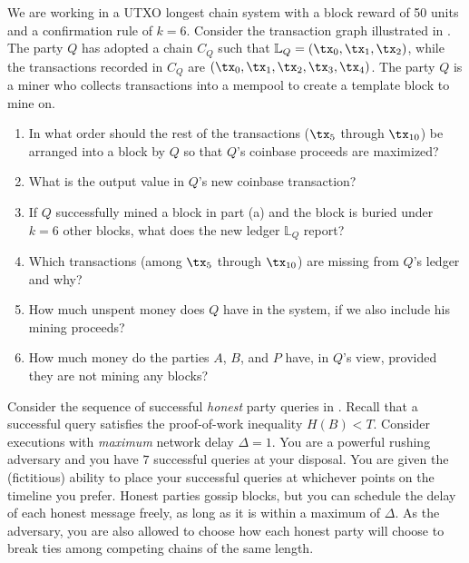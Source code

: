 \begin{problems}
  \item We are working in a UTXO longest chain system with a block reward of 50 units and a confirmation rule of $k = 6$.
        Consider the transaction graph illustrated in .
        The party $Q$ has adopted a chain $C_Q$ such that $\mathbb{L}_Q = (\tx_0, \tx_1, \tx_2)$,
        while the transactions recorded in $C_Q$ are $(\tx_0, \tx_1, \tx_2, \tx_3, \tx_4)$. 
        The party $Q$ is a miner who collects transactions into a mempool to create a template block to mine on.
        \label{problem.tx-graph-2}
        \begin{enumerate}
          \item In what order should the rest of the transactions ($\tx_5$ through $\tx_{10}$) be arranged into a block by $Q$
                so that $Q$'s coinbase proceeds are maximized?
          \item What is the output value in $Q$'s new coinbase transaction?
          \item If $Q$ successfully mined a block in part (a) and the block is buried under $k = 6$ other blocks,
                what does the new ledger $\mathbb{L}_Q$ report?
          \item Which transactions (among $\tx_5$ through $\tx_{10}$) are missing from $Q$'s ledger and why?
          \item How much unspent money does $Q$ have in the system, if we also include his mining proceeds?
          \item How much money do the parties $A$, $B$, and $P$ have, in $Q$'s view, provided they are not mining any blocks?
        \end{enumerate}
      
    \item Consider the sequence of successful \emph{honest} party queries in .
          Recall that a successful query satisfies the proof-of-work inequality $H(B) < T$.
          Consider executions with \emph{maximum} network delay $\Delta = 1$.
          You are a powerful rushing adversary and you have $7$ successful queries at your disposal.
          You are given the (fictitious) ability to place your successful queries at whichever points on the timeline you prefer.
          Honest parties gossip blocks, but you can schedule the delay of each honest message freely, as long as it is within a maximum of $\Delta$.
          As the adversary, you are also allowed to choose how each honest party will choose to break ties among competing chains of the same length.


\end{problems}
